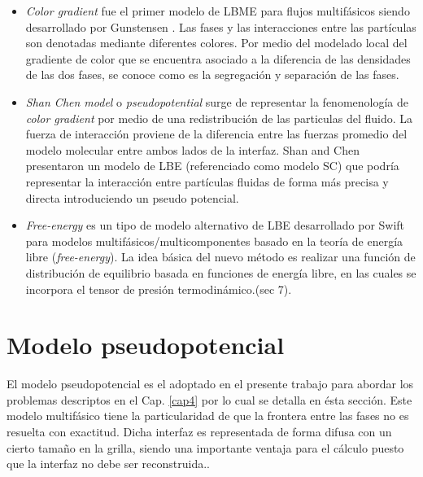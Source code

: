 \begin{itemize}
	
	\item \textit{Color gradient} fue el primer modelo de LBME para flujos multifásicos siendo desarrollado por Gunstensen \cite{gunstensen1991lattice}. Las fases y las interacciones entre las partículas son denotadas mediante diferentes colores. Por medio del modelado local del gradiente de color que se encuentra asociado a la diferencia de las densidades de las dos fases, se conoce como es la segregación y separación de las fases.
	
	\item \textit{Shan Chen model} o \textit{pseudopotential} surge de representar la fenomenología de \textit{color gradient} por medio de una redistribución de las particulas del fluido. La fuerza de interacción proviene de la diferencia entre las fuerzas promedio del modelo molecular  entre ambos lados de la interfaz. Shan and Chen \cite{shan1993lattice} presentaron un modelo de LBE (referenciado como modelo SC) que podría representar la interacción entre partículas fluidas de forma más precisa y directa introduciendo un pseudo potencial. 
	
	\item \textit{Free-energy} es un tipo de modelo alternativo de LBE desarrollado por Swift \cite{swift1995lattice} para modelos multifásicos/multicomponentes basado en la teoría de energía libre (\textit{free-energy}). La idea básica del nuevo método es realizar una función de distribución de equilibrio basada en funciones de energía libre, en las cuales se incorpora el tensor de presión termodinámico.\cite{guo2013lattice}(sec 7).
	
	\iffalse
	Debido a que la fenomenología representada en los modelos de LBE de color y pseudo potenciales son la misma. \textbf{se corta la oracion}
	\fi
	
\end{itemize}




\section{Modelo pseudopotencial}

El modelo pseudopotencial es el adoptado en el presente trabajo para abordar los problemas descriptos en el Cap. \ref{cap4} por lo cual se detalla en ésta sección. Este modelo multifásico tiene la particularidad de que la frontera entre las fases no es resuelta con exactitud. Dicha interfaz es representada de forma difusa con un cierto tamaño en la grilla, siendo una importante ventaja para el cálculo puesto que la interfaz no debe ser reconstruida.\cite{parrill2019reviews}.


